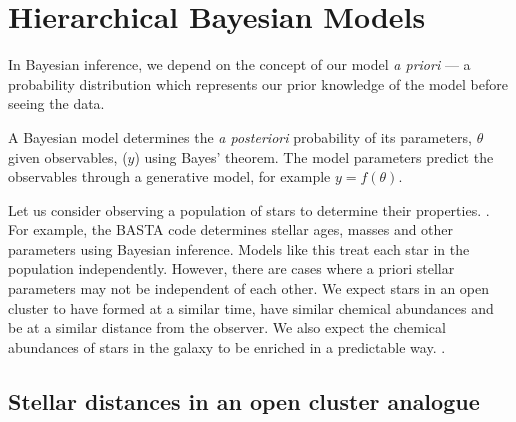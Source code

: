 %
%
%
%
%
\chapter{Hierarchical Bayesian Models}


In Bayesian inference, we depend on the concept of our model \emph{a priori} --- a probability distribution which represents our prior knowledge of the model before seeing the data.

A Bayesian model determines the \emph{a posteriori} probability of its parameters, \(\theta\) given observables, (\(y\)) using Bayes' theorem. The model parameters predict the observables through a generative model, for example \(y = f(\theta)\). 

Let us consider observing a population of stars to determine their properties. . For example, the BASTA code determines stellar ages, masses and other parameters using Bayesian inference. Models like this treat each star in the population independently. However, there are cases where a priori stellar parameters may not be independent of each other. We expect stars in an open cluster to have formed at a similar time, have similar chemical abundances and be at a similar distance from the observer. We also expect the chemical abundances of stars in the galaxy to be enriched in a predictable way. .

\section[Stellar distances]{Stellar distances in an open cluster analogue}\label{sec:hbm-dist}

